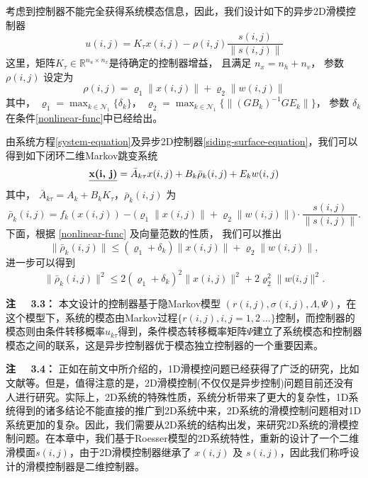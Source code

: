 	考虑到控制器不能完全获得系统模态信息，因此，我们设计如下的异步2D滑模控制器
	\begin{equation}\label{smc-law}
	u(i,j) = K_{\tau }x(i,j)-\rho(i,j)\frac{s(i,j)}{\|s(i,j)\|}
	\end{equation}
	这里，矩阵$K_{\tau }\in\mathbb{R}^{n_u\times n_x}$是待确定的控制器增益， 且满足 $n_x=n_h+n_v$， 参数 $\rho(i,j)$ 设定为
	\begin{equation}\label{varrho}
	\rho(i,j) = \varrho_{1}\|x(i,j)\| + \varrho_{2}\|w(i,j)\|
	\end{equation}
	其中， $\varrho_{1}=\max_{k\in\mathcal{N}_{1}} \{\delta_{k} \}$， $\varrho_{2} = \max_{k\in\mathcal{N}_{1}}\{\|(GB_{k})^{-1}GE_{k}\| \} $， 参数 $\delta_{k}$ 在条件\eqref{nonlinear-func}中已经给出。 
	
	由系统方程\eqref{system-equation}及异步2D控制器\eqref{siding-surface-equation}，我们可以得到如下闭环二维Markov跳变系统
	\begin{equation} \label{closed-loop-system-equation}
	\emph{\textbf{x(i, j)}} = \bar{A}_{k\tau }x(i,j)+B_{k}\bar{\rho}_{k}(i,j)+E_{k}w(i,j)
	\end{equation}
	其中， $\bar{A}_{k\tau } = A_{k}+B_{k}K_{\tau }$，$\bar{\rho}_{k}(i,j)$ 为
	\begin{equation*}
	\bar\rho_{k}(i,j)=f_{k}(x(i,j))-\big(\varrho_{1}\|x(i,j)\|+\varrho_{2}\|w(i,j)\|\big)\cdot\frac{s(i,j)}{\|s(i,j)\|}.
	\end{equation*}
	下面，根据 \eqref{nonlinear-func} 及向量范数的性质， 我们可以推出
	\begin{equation}\label{norm-rho-inequality}
	\|\bar{\rho}_{k}(i,j)\| \leq (\varrho_{1}+\delta_{k})\|x(i,j)\| + \varrho_{2}\|w(i,j)\| ,
	\end{equation} 
	进一步可以得到
	\begin{equation}\label{rholeseq}
	\|\bar{\rho}_{k}(i,j)\|^{2} \leq 2(\varrho_{1}+\delta_{k})^{2}\|x(i,j)\|^{2} +2\varrho_{2}^{2}\|w(i,j\|^{2} .
	\end{equation}	
	
	{\bf 注 \ \ 3.3：}
	本文设计的控制器基于隐Markov模型 $(r(i,j),\sigma(i,j),\varLambda,\varPsi)$，在这个模型下，系统的模态由Markov过程$\{r(i,j), i,j=1,2\ \dots\}$控制，而控制器的模态则由条件转移概率$u_{k\tau}$得到，条件模态转移概率矩阵$\varPsi$建立了系统模态和控制器模态之间的联系，这是异步控制器优于模态独立控制器的一个重要因素。
	
	{\bf 注 \ \ 3.4：}
	正如在前文中所介绍的，1D滑模控问题已经获得了广泛的研究，比如文献\cite{song2018asynchronous,li2017passivity,qi2018observer}等。但是，值得注意的是，2D滑模控制(不仅仅是异步控制)问题目前还没有人进行研究。实际上，2D系统的特殊性质，系统分析带来了更大的复杂性，1D系统得到的诸多结论不能直接的推广到2D系统中来，2D系统的滑模控制问题相对1D系统更加的复杂。因此，我们需要从2D系统的结构出发，来研究2D系统的滑模控制问题。在本章中，我们基于Roesser模型的2D系统特性，重新的设计了一个二维滑模面$s(i,j)$，由于2D滑模控制器继承了 $x(i,j)$ 及 $s(i,j)$，因此我们称呼设计的滑模控制器是二维控制器。

